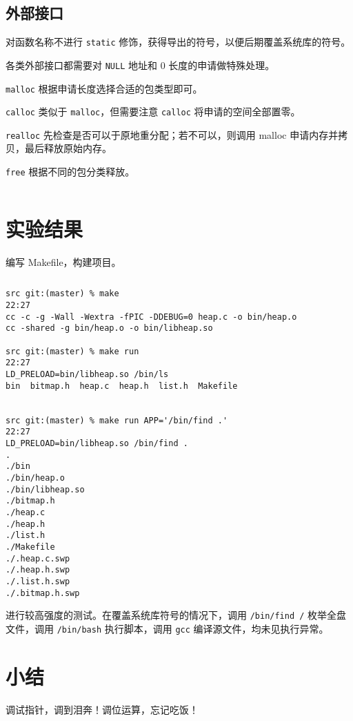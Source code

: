 \documentclass[12pt, a4paper]{article}
\newcommand{\LabSrc}[1]{\inputminted[fontsize=\scriptsize, breaklines]{c}{./src/#1.c}}
\begin{document}
\LabSrc{buck_alloc}

\subsection{外部接口}
对函数名称不进行 \texttt{static} 修饰，获得导出的符号，以便后期覆盖系统库的符号。

各类外部接口都需要对 \texttt{NULL} 地址和 0 长度的申请做特殊处理。

\texttt{malloc} 根据申请长度选择合适的包类型即可。

\texttt{calloc} 类似于 \texttt{malloc}，但需要注意 \texttt{calloc} 将申请的空间全部置零。

\texttt{realloc} 先检查是否可以于原地重分配；若不可以，则调用 malloc 申请内存并拷贝，最后释放原始内存。

\texttt{free} 根据不同的包分类释放。

\LabSrc{interface}

\section{实验结果}

编写 Makefile，构建项目。

\inputminted[fontsize=\scriptsize, breaklines]{makefile}{../src/Makefile}

{\scriptsize
\begin{verbatim}
src git:(master) % make                                                          22:27
cc -c -g -Wall -Wextra -fPIC -DDEBUG=0 heap.c -o bin/heap.o
cc -shared -g bin/heap.o -o bin/libheap.so

src git:(master) % make run                                                      22:27
LD_PRELOAD=bin/libheap.so /bin/ls
bin  bitmap.h  heap.c  heap.h  list.h  Makefile


src git:(master) % make run APP='/bin/find .'                                    22:27
LD_PRELOAD=bin/libheap.so /bin/find .
.
./bin
./bin/heap.o
./bin/libheap.so
./bitmap.h
./heap.c
./heap.h
./list.h
./Makefile
./.heap.c.swp
./.heap.h.swp
./.list.h.swp
./.bitmap.h.swp
\end{verbatim}
}

进行较高强度的测试。在覆盖系统库符号的情况下，调用 \texttt{/bin/find /} 枚举全盘文件，调用 \texttt{/bin/bash} 执行脚本，调用 \texttt{gcc} 编译源文件，均未见执行异常。

\section{小结}
调试指针，调到泪奔！调位运算，忘记吃饭！
\end{document}
